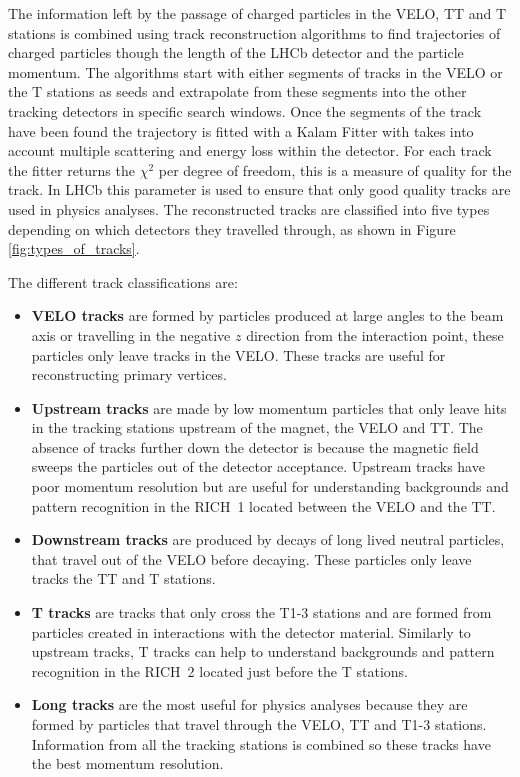 The information left by the passage of charged particles in the VELO, TT and T stations is combined using track reconstruction algorithms to find trajectories of charged particles though the length of the LHCb detector and the particle momentum.  
The algorithms start with either segments of tracks in the VELO or the T stations as seeds and extrapolate from these segments into the other tracking detectors in specific search windows. 
Once the segments of the track have been found the trajectory is fitted with a Kalam Fitter with takes into account multiple scattering and energy loss within the detector. For each track the fitter returns the $\chi^{2}$ per degree of freedom, this is a measure of quality for the track. In LHCb this parameter is used to ensure that only good quality tracks are used in physics analyses. 
The reconstructed tracks are classified into five types depending on which detectors they travelled through, as shown in Figure \ref{fig:types_of_tracks}.



The different track classifications are:
\begin{itemize}
\item {\bf VELO tracks} are formed by particles produced at large angles to the beam axis or travelling in the negative $z$ direction from the interaction point, these particles only leave tracks in the VELO. These tracks are useful for reconstructing primary vertices.  
\item {\bf Upstream tracks} are made by low momentum particles that only leave hits in the tracking stations upstream of the magnet, the VELO and TT. The absence of tracks further down the detector is because the magnetic field sweeps the particles out of the detector acceptance. Upstream tracks have poor momentum resolution but are useful for understanding backgrounds and pattern recognition in the RICH~1 located between the VELO and the TT.
\item {\bf Downstream tracks} are produced by decays of long lived neutral particles, that travel out of the VELO before decaying. These particles only leave tracks the TT and T stations. 
\item {\bf T tracks} are tracks that only cross the T1-3 stations and are formed from particles created in interactions with the detector material. Similarly to upstream tracks, T tracks can help to understand backgrounds and pattern recognition in the RICH~2 located just before the T stations.
\item {\bf Long tracks} are the most useful for physics analyses because they are formed by particles that travel through the VELO, TT and T1-3 stations. Information from all the tracking stations is combined so these tracks have the best momentum resolution.
\end{itemize}


